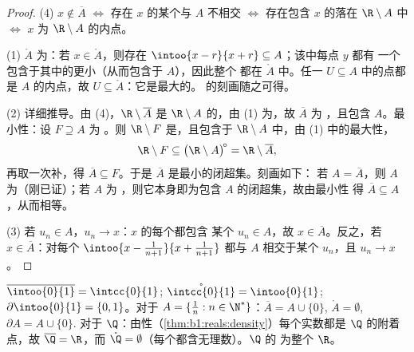 \begin{proof}
(4) $x \notin \overline A$ $\iff$ 存在 $x$ 的某个与 $A$ 不相交
$\iff$ 存在包含 $x$ 的落在 $\R \setminus A$ 中 $\iff$ $x$
为 $\R \setminus A$ 的内点。

(1) $\mathring A$ 为：若 $x \in \mathring A$，则存在
$\intoo{x-r}{x+r} \subseteq A$；该中每点 $y$ 都有
一个包含于其中的更小（从而包含于 $A$），因此整个
都在 $\mathring A$ 中。任一 $U \subseteq A$ 中的点都是
$A$ 的内点，故 $U \subseteq \mathring A$：它是最大的。
的刻画随之可得。

(2) 详细推导。由 (4)，$\R \setminus \overline A$ 是
$\R \setminus A$ 的，由 (1) 为，故 $\overline A$ 为
，且包含 $A$。最小性：设 $F \supseteq A$ 为
。则 $\R \setminus F$ 是，且包含于 $\R
\setminus A$ 中，由 (1) 中的最大性，
\[
\R \setminus F \subseteq \bigl(\R \setminus A\bigr)^{\!\circ}
= \R \setminus \overline A ,
\]
再取一次补，得 $\overline A \subseteq F$。于是
$\overline A$ 是最小的闭超集。刻画如下：
若 $A = \overline A$，则 $A$ 为（刚已证）；若 $A$ 为
，则它本身即为包含 $A$ 的闭超集，故由最小性
得 $\overline A \subseteq A$，从而相等。

(3) 若 $u_n \in A$，$u_n \to x$：$x$ 的每个都包含
某个 $u_n \in A$，故 $x \in \overline A$。反之，若 $x \in
\overline A$：对每个 $\intoo{x - \frac{1}{n+1}}{x +
\frac{1}{n+1}}$ 都与 $A$ 相交于某个 $u_n$，且 $u_n \to x$。
\end{proof}

\begin{example}\label{ex:b1:topology:closureexamples}
$\overline{\intoo{0}{1}} = \intcc{0}{1}$;
$\mathring{\intcc{0}{1}} = \intoo{0}{1}$; $\partial\intoo{0}{1} =
\{0, 1\}$。对于 $A = \{\frac 1n : n \in \N^*\}$：$\overline A = A
\cup \{0\}$, $\mathring A = \emptyset$, $\partial A = A \cup \{0\}$.
对于 $\Q$：由性（\cref{thm:b1:reals:density}）每个实数都是
$\Q$ 的附着点，故 $\overline{\Q} = \R$，而 $\mathring{\Q} =
\emptyset$（每个都含无理数）。$\Q$ 的
为整个 $\R$。
\end{example}

